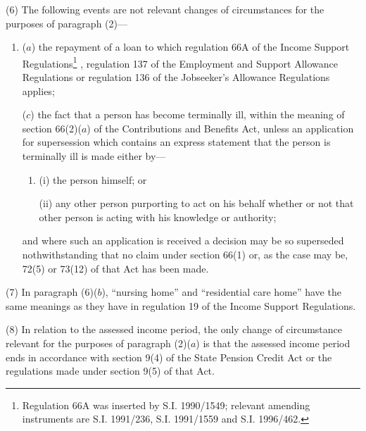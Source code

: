 \documentclass[12pt,a4paper]{article}
\begin{document}
(6) The following events are not relevant changes of circumstances for the purposes of paragraph (2)—
\begin{enumerate}\item[]
($a$) the repayment of a loan to which regulation 66A of the Income Support Regulations\footnote{\frenchspacing Regulation 66A was inserted by S.I. 1990/1549; relevant amending instruments are S.I. 1991/236, S.I. 1991/1559 and S.I. 1996/462.}%
, regulation 137 of the Employment and Support Allowance Regulations  %
or regulation 136 of the Jobseeker’s Allowance Regulations applies;

%

($c$) the fact that a person has become terminally ill, within the meaning of section 66(2)($a$) of the Contributions and Benefits Act, unless an application for supersession which contains an express statement that the person is terminally ill is made either by—
\begin{enumerate}\item[]
(i) the person himself; or

(ii) any other person purporting to act on his behalf whether or not that other person is acting with his knowledge or authority;
\end{enumerate}
and where such an application is received a decision may be so superseded nothwithstanding that no claim under section 66(1) or, as the case may be, 72(5) or 73(12) of that Act has been made.
\end{enumerate}

(7) In paragraph (6)($b$), “nursing home” and “residential care home” have the same meanings as they have in regulation 19 of the Income Support Regulations.

(8) In relation to the assessed income period, the only change of circumstance relevant for the purposes of paragraph (2)($a$)  is that the assessed income period ends in accordance with section 9(4) of the State Pension Credit Act or the regulations made under section 9(5) of that Act.
\end{document}
